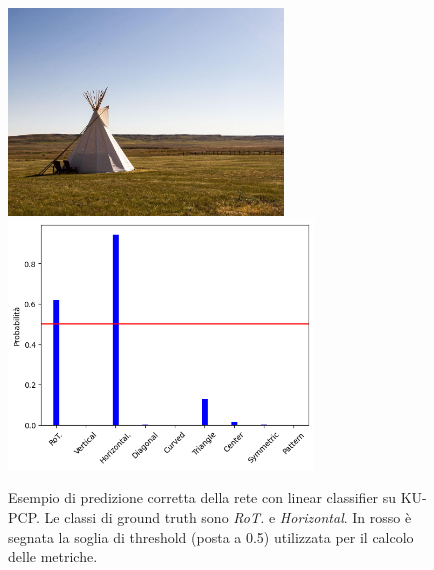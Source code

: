 \begin{figure}[p]
    \centering
    \includegraphics[height=55mm, valign=t]{Immagini/risultati/0207.jpg}
    \includegraphics[height=66mm, valign=t]{Immagini/risultati/207_prob.png}
    
    \caption{Esempio di predizione corretta della rete con linear classifier su KU-PCP. Le classi di ground truth sono \textit{RoT.} e \textit{Horizontal}. In rosso è segnata la soglia di threshold (posta a 0.5) utilizzata per il calcolo delle metriche.}
    \label{fig:kupcp_prob}
\end{figure}


